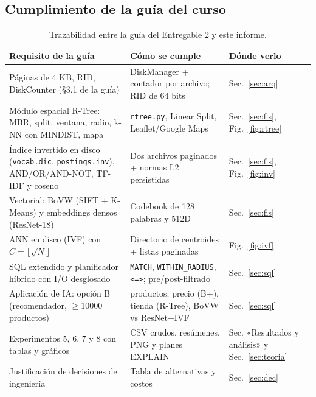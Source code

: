 \documentclass[11pt,a4paper]{article}
\newcommand{\code}[1]{\texttt{#1}}
\begin{document}
\subsection{Cumplimiento de la guía del curso}
\begin{table}[H]\centering\small
\begin{tabular}{@{}>{\raggedright\arraybackslash}p{5.6cm}>{\raggedright\arraybackslash}p{5.2cm}>{\raggedright\arraybackslash}p{4.2cm}@{}}\toprule
Requisito de la guía & Cómo se cumple & Dónde verlo\\\midrule
Páginas de 4 KB, RID, DiskCounter (\S3.1 de la guía) & DiskManager + contador por archivo; RID de 64 bits & Sec.~\ref{sec:arq}\\
Módulo espacial R-Tree: MBR, split, ventana, radio, k-NN con MINDIST, mapa & \code{rtree.py}, Linear Split, Leaflet/Google Maps & Sec.~\ref{sec:fis}, Fig.~\ref{fig:rtree}\\
Índice invertido en disco (\code{vocab.dic}, \code{postings.inv}), AND/OR/AND-NOT, TF-IDF y coseno & Dos archivos paginados + normas L2 persistidas & Sec.~\ref{sec:fis}, Fig.~\ref{fig:inv}\\
Vectorial: BoVW (SIFT + K-Means) y embeddings densos (ResNet-18) & Codebook de 128 palabras y 512D & Sec.~\ref{sec:fis}\\
ANN en disco (IVF) con $C=\lfloor\sqrt N\rfloor$ & Directorio de centroides + listas paginadas & Fig.~\ref{fig:ivf}\\
SQL extendido y planificador híbrido con I/O desglosado & \code{MATCH}, \code{WITHIN\_RADIUS}, \code{<=>}; pre/post-filtrado & Sec.~\ref{sec:sql}\\
Aplicación de IA: opción B (recomendador, $\geq$10000 productos) & 10000 productos; precio (B+), tienda (R-Tree), BoVW vs ResNet+IVF & Sec.~\ref{sec:sql}\\
Experimentos 5, 6, 7 y 8 con tablas y gráficos & CSV crudos, resúmenes, PNG y planes EXPLAIN & Sec. «Resultados y análisis» y Sec.~\ref{sec:teoria}\\
Justificación de decisiones de ingeniería & Tabla de alternativas y costos & Sec.~\ref{sec:dec}\\\bottomrule
\end{tabular}\caption{Trazabilidad entre la guía del Entregable 2 y este informe.}
\end{table}
\end{document}
